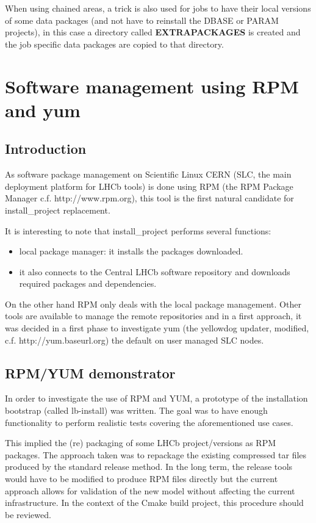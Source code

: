 \documentclass{lhcbnote}
\begin{document}
When using chained areas, a trick is also used for jobs to have their local versions of some data packages (and not have to reinstall the DBASE or PARAM projects), in this case a directory called \textbf{EXTRAPACKAGES} is created and the job specific data packages are copied to that directory.


\section{Software management using RPM and yum }

\subsection{Introduction}

As software package management on Scientific Linux CERN (SLC, the main deployment platform for LHCb tools) is done using RPM (the RPM Package Manager c.f. http://www.rpm.org), this tool is the first natural candidate for install\_project replacement.

It is interesting to note that install\_project performs several functions:
\begin{itemize}
\item local package manager: it installs the packages downloaded.
\item it also connects to the Central LHCb software repository and downloads required packages and dependencies. 
\end{itemize}
On the other hand RPM only deals with the local package management.
Other tools are available to manage the remote repositories and in a first approach, it was decided in a first phase to investigate yum (the yellowdog updater, modified, c.f. http://yum.baseurl.org) the default on user managed SLC nodes.

\subsection{RPM/YUM demonstrator}

In order to investigate the use of RPM and YUM, a prototype of the installation bootstrap (called lb-install) was written. The goal was to have enough functionality to perform realistic tests covering the aforementioned use cases.

This implied the (re) packaging of some LHCb project/versions as RPM packages. The approach taken was to repackage the existing compressed tar files produced by the standard release method. In the long term, the release tools would have to be modified to produce RPM files directly but the current approach allows for validation of the new model without affecting the current infrastructure. In the context of the Cmake build project, this procedure should be reviewed.
\end{document}
